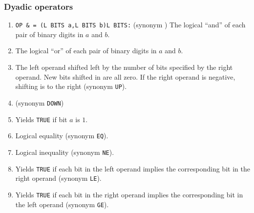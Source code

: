 \subsubsection*{Dyadic operators}
\begin{enumerate}
\item \verb|OP & = (L BITS a,L BITS b)L BITS:|\newline
(synonym )\newline
The logical ``and'' of each pair of binary digits in $a$ and $b$.
\item {} \newline
The logical ``or'' of each pair of binary digits in $a$ and $b$.
\item {}\newline
The left operand shifted left by the number of bits specified by the
right operand. New bits shifted in are all zero. If the right operand is
negative, shifting is to the right (synonym \verb|UP|).
\item {}\newline
(synonym \verb|DOWN|)
\item {} \newline
Yields \verb|TRUE| if bit $a$ is $1$.
\item {} \newline
Logical equality (synonym \verb|EQ|).
\item {} \newline
Logical inequality (synonym \verb|NE|).
\item {}\newline
Yields \verb|TRUE| if each bit in the left operand implies the
corresponding bit in the right operand (synonym \verb|LE|).
\item {}\newline
Yields \verb|TRUE| if each bit in the right operand implies the
corresponding bit in the left operand (synonym \verb|GE|).
\end{enumerate}

